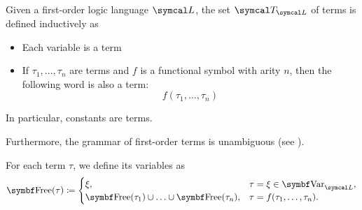 \begin{definition}\label{def:first_order_term}\cite[189]{OpenLogic20201202}
  Given a first-order logic language \( \Cal{L} \), the set \( \Cal{T}_{\Cal{L}} \) of terms is defined inductively as
  \begin{itemize}
    \item Each variable is a term
    \item If \( \tau_1, \ldots, \tau_n \) are terms and \( f \) is a functional symbol with arity \( n \), then the following word is also a term:
    \begin{equation*}
      f(\tau_1, \ldots, \tau_n)
    \end{equation*}
  \end{itemize}

  In particular, constants are terms.

  Furthermore, the grammar of first-order terms is unambiguous (see ).

  For each term \( \tau \), we define its variables as
  \begin{align*}
    \Cat{Free}(\tau) \coloneqq \begin{cases}
      \xi,                                                      &\tau = \xi \in \Cat{Var}_{\Cal{L}}, \\
      \Cat{Free}(\tau_1) \cup \ldots \cup \Bold{Free}(\tau_n), &\tau = f(\tau_1, \ldots, \tau_n).
    \end{cases}
  \end{align*}
\end{definition}

